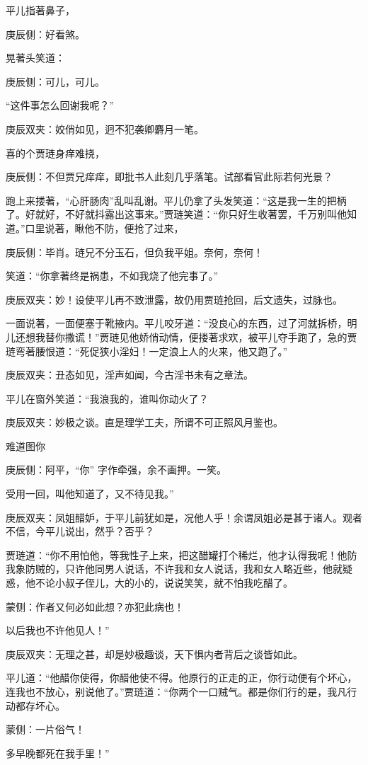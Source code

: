 \begin{parag}
    平儿指著鼻子，\begin{note}庚辰侧：好看煞。\end{note}晃著头笑道：\begin{note}庚辰侧：可儿，可儿。\end{note}“这件事怎么回谢我呢？”\begin{note}庚辰双夹：姣俏如见，迥不犯袭卿麝月一笔。\end{note}喜的个贾琏身痒难挠，\begin{note}庚辰侧：不但贾兄痒痒，即批书人此刻几乎落笔。试部看官此际若何光景？\end{note}跑上来搂著，“心肝肠肉”乱叫乱谢。平儿仍拿了头发笑道：“这是我一生的把柄了。好就好，不好就抖露出这事来。”贾琏笑道：“你只好生收著罢，千万别叫他知道。”口里说著，瞅他不防，便抢了过来，\begin{note}庚辰侧：毕肖。琏兄不分玉石，但负我平姐。奈何，奈何！\end{note}笑道：“你拿著终是祸患，不如我烧了他完事了。”\begin{note}庚辰双夹：妙！设使平儿再不致泄露，故仍用贾琏抢回，后文遗失，过脉也。\end{note}一面说著，一面便塞于靴掖内。平儿咬牙道：“没良心的东西，过了河就拆桥，明儿还想我替你撒谎！”贾琏见他娇俏动情，便搂著求欢，被平儿夺手跑了，急的贾琏弯著腰恨道：“死促狭小淫妇！一定浪上人的火来，他又跑了。”\begin{note}庚辰双夹：丑态如见，淫声如闻，今古淫书未有之章法。\end{note}平儿在窗外笑道：“我浪我的，谁叫你动火了？\begin{note}庚辰双夹：妙极之谈。直是理学工夫，所谓不可正照风月鉴也。\end{note}难道图你\begin{note}庚辰侧：阿平，“你” 字作牵强，余不画押。一笑。\end{note}受用一回，叫他知道了，又不待见我。”\begin{note}庚辰双夹：凤姐醋妒，于平儿前犹如是，况他人乎！余谓凤姐必是甚于诸人。观者不信，今平儿说出，然乎？否乎？\end{note}贾琏道：“你不用怕他，等我性子上来，把这醋罐打个稀烂，他才认得我呢！他防我象防贼的，只许他同男人说话，不许我和女人说话，我和女人略近些，他就疑惑，他不论小叔子侄儿，大的小的，说说笑笑，就不怕我吃醋了。\begin{note}蒙侧：作者又何必如此想？亦犯此病也！\end{note}以后我也不许他见人！”\begin{note}庚辰双夹：无理之甚，却是妙极趣谈，天下惧内者背后之谈皆如此。\end{note}平儿道：“他醋你使得，你醋他使不得。他原行的正走的正，你行动便有个坏心，连我也不放心，别说他了。”贾琏道：“你两个一口贼气。都是你们行的是，我凡行动都存坏心。\begin{note}蒙侧：一片俗气！\end{note}多早晚都死在我手里！”
\end{parag}


